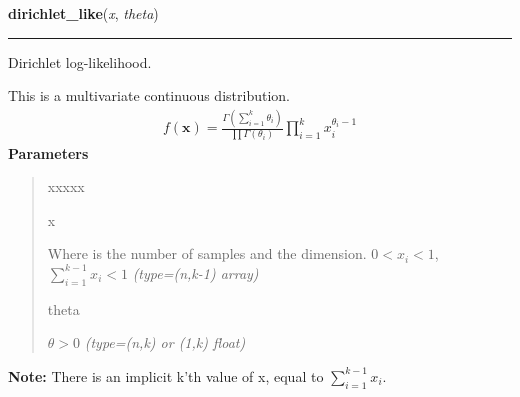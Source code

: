 \hspace{.8\funcindent}\begin{boxedminipage}{\funcwidth}

    \raggedright \textbf{dirichlet\_like}(\textit{x}, \textit{theta})

    \vspace{-1.5ex}

    \rule{\textwidth}{1pt}
\setlength{\parskip}{2ex}

Dirichlet log-likelihood.

This is a multivariate continuous distribution.
\begin{equation*}\begin{split}f(\mathbf{x}) = \frac{\Gamma(\sum_{i=1}^k \theta_i)}{\prod \Gamma(\theta_i)} \prod_{i=1}^k x_i^{\theta_i - 1}\end{split}\end{equation*}\setlength{\parskip}{1ex}
      \textbf{Parameters}
      \vspace{-1ex}

      \begin{quote}
        \begin{Ventry}{xxxxx}

          \item[x]


Where  is the number of samples and  the dimension.
$0 < x_i < 1$,  $\sum_{i=1}^{k-1} x_i < 1$
            {\it (type=(n,k-1) array)}

          \item[theta]


$\theta > 0$
            {\it (type=(n,k) or (1,k) float)}

        \end{Ventry}

      \end{quote}

\textbf{Note:} 
There is an implicit k'th value of x, equal to $\sum_{i=1}^{k-1} x_i$.


    \end{boxedminipage}

    \label{pymc:distributions:discrete_uniform_like}

    \vspace{0.5ex}

